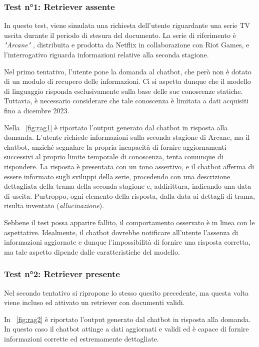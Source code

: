 \subsubsection{Test n°1: Retriever assente}
In questo test, viene simulata una richiesta dell'utente riguardante una serie TV uscita durante il periodo di stesura del documento. La serie di riferimento è \textit{"Arcane"} \cite{arcane}, distribuita e prodotta da Netflix in collaborazione con Riot Games, e l'interrogativo riguarda informazioni relative alla seconda stagione.

Nel primo tentativo, l'utente pone la domanda al chatbot, che però non è dotato di un modulo di recupero delle informazioni. Ci si aspetta dunque che il modello di linguaggio risponda esclusivamente sulla base delle sue conoscenze statiche. Tuttavia, è necessario considerare che tale conoscenza è limitata a dati acquisiti fino a dicembre 2023.

Nella \figurename{~\ref{fig:rag1}} è riportato l'output generato dal chatbot in risposta alla domanda. L'utente richiede informazioni sulla seconda stagione di Arcane, ma il chatbot, anziché segnalare la propria incapacità di fornire aggiornamenti successivi al proprio limite temporale di conoscenza, tenta comunque di rispondere. La risposta è presentata con un tono assertivo, e il chatbot afferma di essere informato sugli sviluppi della serie, procedendo con una descrizione dettagliata della trama della seconda stagione e, addirittura, indicando una data di uscita. Purtroppo, ogni elemento della risposta, dalla data ai dettagli di trama, risulta inventato (\textit{allucinazione}).

Sebbene il test possa apparire fallito, il comportamento osservato è in linea con le aspettative. Idealmente, il chatbot dovrebbe notificare all'utente l'assenza di informazioni aggiornate e dunque l'impossibilità di fornire una risposta corretta, ma tale aspetto dipende dalle caratteristiche del modello.

\subsubsection{Test n°2: Retriever presente}
Nel secondo tentativo si ripropone lo stesso quesito precedente, ma questa volta viene incluso ed attivato un retriever con documenti validi.

In \figurename{~\ref{fig:rag2}} è riportato l'output generato dal chatbot in risposta alla domanda. In questo caso il chatbot attinge a dati aggiornati e validi ed è capace di fornire informazioni corrette ed estremamente dettagliate.


